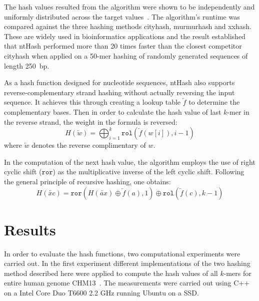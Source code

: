 \documentclass[11pt,a4paper]{scrartcl}
\newcommand{\rol}[0]{\mathtt{rol}}
\newcommand{\ror}[0]{\mathtt{ror}}
\begin{document}
The hash values resulted from the algorithm were shown to be independently and uniformly
distributed across the target values~\cite{MOH:CHU:VAN:BIR:2016}.
The algorithm's runtime 
was compared against the three hashing methods cityhash, murmurhash and xxhash.
These are widely used in bioinformatics applications and the result established
that ntHash performed more than 20 times faster than the closest competitor
cityhash when applied on a 50-mer hashing of randomly generated sequences of length 250~bp.

As a hash function designed for nucleotide sequences, ntHash also supports
reverse-complementary strand hashing without actually reversing the input
sequence. It achieves this through creating a lookup table $\overleftarrow{f}$ to
determine the complementary bases. Then in order to calculate the hash value
of last \(k\)-mer in the reverse strand, the weight in the formula is reversed:
\begin{equation}
H(\overleftarrow{w}) = \bigoplus_{i=1}^k \rol(\overleftarrow{f}(w[i]),i-1)
\end{equation}
where $\overleftarrow{w}$ denotes the reverse complimentary of $w$.

In the computation of the next hash value, the algorithm employs the use of
right cyclic shift ($\ror$) as the multiplicative inverse of the left cyclic
shift. Following the general principle of recursive hashing, one obtains:
\begin{equation}
H(\overleftarrow{xc}) = \ror(H(\overleftarrow{ax})\oplus \overleftarrow{f}(a),1)\oplus
\rol(\overleftarrow{f}(c),k-1)
\end{equation}
\section{Results}
In order to evaluate the hash functions, two computational experiments
were carried out. In the first experiment different implementations of
the two hashing method described here were
applied to compute the hash values of all \(k\)-mers for entire
human genome CHM13~\cite{Rhie2022.12.01.518724}. The measurements were carried out using C++ on a Intel Core Duo T6600 2.2 GHz running Ubuntu on a SSD.
\end{document}
